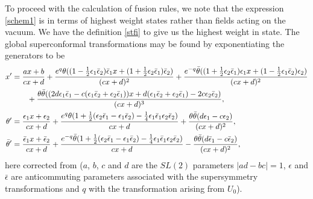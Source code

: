\documentclass[a4paper,12pt]{article}
\def\thetabar    {\bar{\theta}}
\def\hf          {\tfrac{1}{2}}
\begin{document}
To proceed with the calculation of fusion rules, we note that the
expression \eqref{schem1} is in terms of highest weight states rather
than fields acting on the vacuum.  We have the definition \eqref{stfi}
to give us the highest weight in state.  The global superconformal
transformations may be found by exponentiating the generators to be
\begin{align}
x'&=\frac{ax+b}{cx+d}+ \frac{e^q\theta((1-\hf\epsilon_1
\bar{\epsilon}_2)\bar{\epsilon}_1 x + (1+\hf\epsilon_2
\bar{\epsilon}_1)\bar{\epsilon}_2)}{(cx+d)^2} + 
\frac{e^{-q}\thetabar((1+\hf\epsilon_2 
\bar{\epsilon}_1)\epsilon_1 x + (1-\hf\epsilon_1
\bar{\epsilon}_2)\epsilon_2)}{(cx+d)^2}\notag\\
 &\qquad+
 \frac{\theta\thetabar((2d\epsilon_1\bar{\epsilon}_1-c(\epsilon_1\bar{\epsilon}_2+\epsilon_2\bar{\epsilon}_1))x+d(\epsilon_1\bar{\epsilon}_2+\epsilon_2\bar{\epsilon}_1)-2c\epsilon_2\bar{\epsilon}_2)}{(cx+d)^3},\notag\\
\theta'&=\frac{\epsilon_1 x+\epsilon_2}{cx+d} +
\frac{e^q\theta(1+\hf(\epsilon_2 \bar{\epsilon}_1-\epsilon_1\bar{\epsilon}_2)
  - \frac{1}{4}\epsilon_1\bar{\epsilon}_1\epsilon_2\bar{\epsilon}_2)}{cx+d} +
\frac{\theta\thetabar(d\epsilon_1-c\epsilon_2)}{(cx+d)^2},\notag\\
\thetabar'&=\frac{\bar{\epsilon}_1 x+\bar{\epsilon}_2}{cx+d} +
\frac{e^{-q}\thetabar(1+\hf(\epsilon_2
  \bar{\epsilon}_1-\epsilon_1\bar{\epsilon}_2)
  - \frac{1}{4}\epsilon_1\bar{\epsilon}_1\epsilon_2\bar{\epsilon}_2)}{cx+d} -
\frac{\theta\thetabar(d\bar{\epsilon}_1-c\bar{\epsilon}_2)}{(cx+d)^2},
\end{align}
here corrected from \cite{Kir} ($a$, $b$, $c$ and $d$ are the $SL(2)$
parameters $|ad-bc|=1$, $\epsilon$ and $\bar{\epsilon}$ are anticommuting 
parameters associated with the supersymmetry transformations and $q$ with the
transformation arising from $U_0$).  
\end{document}

